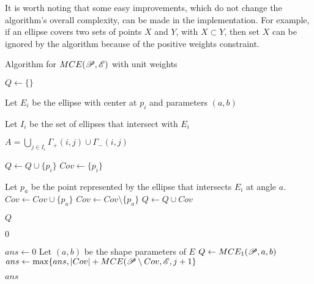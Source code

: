 It is worth noting that some easy improvements, which do not change the algorithm's overall complexity, can be made in the implementation. For example, if an ellipse covers two sets of points $X$ and $Y$, with $X \subset Y$, then set $X$ can be ignored by the algorithm because of the positive weights constraint.




\begin{algoritmo}[b]
\caption{Algorithm for $MCE(\mathscr{P}, \mathscr{E})$ with unit weights}\label{algoritmo:mce}
\begin{algorithmic}[1]
\State $Q \gets \{\}$

\State Let $E_i$ be the ellipse with center at $p_i$ and parameters $(a,b)$

\State Let $I_i$ be the set of ellipses that intersect with $E_i$

\State $A = \bigcup_{j \in I_i} \Gamma_+(i,j) \cup \Gamma_-(i,j)$

\State $Q \gets Q \cup \{p_i\}$ 
\State $Cov \gets \{p_i\}$ 

 
\State Let $p_a$ be the point represented by the ellipse that intersects $E_i$ at angle $a$. 
\State $Cov \gets Cov \cup \{p_a\}$
\Else
\State $Cov \gets Cov \setminus \{p_a\}$
\EndIf
\State $Q \gets Q \cup Cov$
\EndFor
\EndFor
\EndFor

\State \Return $Q$
\EndProcedure

\State \Return $0$
\EndIf

\State $ans \gets 0$
\State Let $(a,b)$ be the shape parameters of $E$
\State $Q \gets MCE_1(\mathscr{P}, a, b)$
\State $ans \gets \max\{ans, |Cov| + MCE(\mathscr{P} \setminus Cov, \mathscr{E}, j+1 \}$ 
\EndFor
\EndFor

\State \Return $ans$
\EndProcedure
\end{algorithmic}
\end{algoritmo}
 